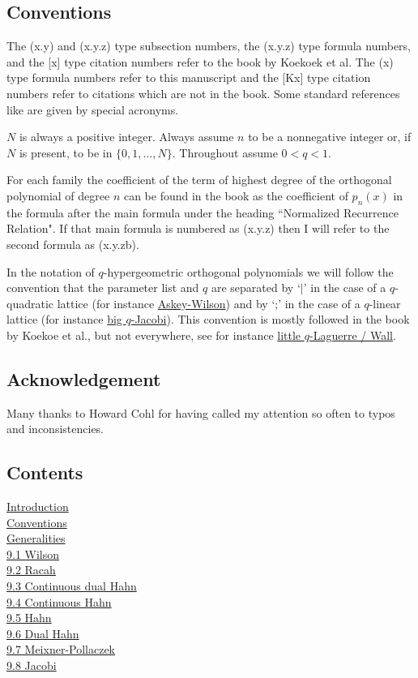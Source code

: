 \documentclass[twoside,11pt]{article}
\newcommand\sa{\smallskipamount}
\newcommand\sLP{\\[\sa]}
\begin{document}
\subsection*{Conventions}
\label{sec_conv}
The (x.y) and (x.y.z) type subsection numbers, the
(x.y.z) type formula numbers, and the [x] type citation numbers
refer to the book by Koekoek et al.
The (x) type formula numbers refer to this manuscript and the [Kx] type citation numbers refer to citations which are not in the book.
Some standard references like 
are given by special acronyms.

$N$ is always a positive integer. Always assume $n$ to be a nonnegative
integer or, if $N$ is present, to be in $\{0,1,\ldots,N\}$.
Throughout assume $0<q<1$.

For each family the coefficient of the term of highest degree of the
orthogonal polynomial of degree $n$ can be found in the book as the
coefficient of $p_n(x)$ in the formula after the main formula under
the heading ``Normalized Recurrence Relation". If that main formula is numbered
as (x.y.z) then I will refer to the second formula as (x.y.zb).

In the notation of $q$-hypergeometric orthogonal polynomials we
will follow the convention that the parameter list and $q$ are separated
by `$ | $' in the case of a $q$-quadratic lattice (for instance
\hyperref[sec14.1]{Askey-Wilson})
and by `;' in the case of a $q$-linear lattice (for instance
\hyperref[sec14.5]{big $q$-Jacobi}). This convention is mostly followed
in the book by Koekoe et al., but not everywhere, see for instance
\hyperref[sec14.20]{little $q$-Laguerre / Wall}.
%
\subsection*{Acknowledgement}
Many thanks to Howard Cohl for having called my attention so often to typos and
inconsistencies.
%
\newpage
\subsection*{Contents}
\hyperref[sec_intro]{Introduction}\\
\hyperref[sec_conv]{Conventions}\\
\hyperref[sec_general]{Generalities}
\sLP
\hyperref[sec9.1]{9.1 Wilson}\\
\hyperref[sec9.2]{9.2 Racah}\\
\hyperref[sec9.3]{9.3 Continuous dual Hahn}\\
\hyperref[sec9.4]{9.4 Continuous Hahn}\\
\hyperref[sec9.5]{9.5 Hahn}\\
\hyperref[sec9.6]{9.6 Dual Hahn}\\
\hyperref[sec9.7]{9.7 Meixner-Pollaczek}\\
\hyperref[sec9.8]{9.8 Jacobi}
\end{document}
